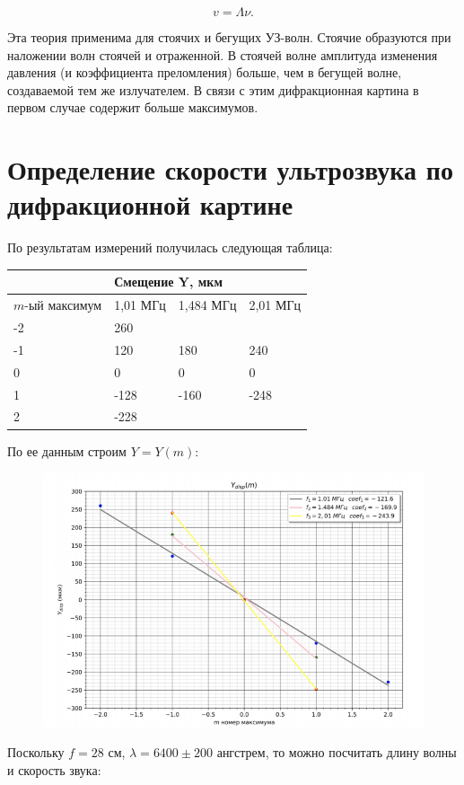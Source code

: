 \documentclass[a4paper,12pt]{article}
\begin{document}
\begin{equation}
v = \Lambda \nu. 
\label{eq6}
\end{equation}

Эта теория применима для стоячих и бегущих УЗ-волн. Стоячие образуются при наложении волн стоячей и отраженной. В стоячей волне амплитуда изменения давления (и коэффициента преломления) больше, чем в бегущей волне, создаваемой тем же излучателем. В связи с этим дифракционная картина в первом случае содержит больше максимумов.

\section{Определение скорости ультрозвука по дифракционной картине}

По результатам измерений получилась следующая таблица:

\begin{table}[h!]
	\begin{tabular}{|l|l|l|l|}
		\hline
		& \multicolumn{3}{l|}{Смещение Y, мкм} \\ \hline
		$m$-ый максимум & 1,01 МГц   & 1,484 МГц   & 2,01 МГц  \\ \hline
		-2              & 260        &             &           \\ \hline
		-1              & 120        & 180         & 240       \\ \hline
		0               & 0          & 0           & 0         \\ \hline
		1               & -128       & -160        & -248      \\ \hline
		2               & -228       &             &           \\ \hline
	\end{tabular}
\end{table}

По ее данным строим $Y=Y(m)$:

\begin{figure}[h!]
	\begin{center}
		\includegraphics[scale = 0.8]{1.png}
	\end{center}
\end{figure}
\newpage
Поскольку $f = 28$ см, $\lambda = 6400 \pm 200$ ангстрем, то можно посчитать длину волны и скорость звука:
\end{document}
